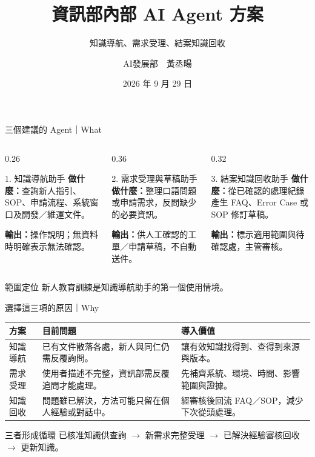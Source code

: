 \documentclass[aspectratio=169,12pt]{beamer}
\title{資訊部內部 AI Agent 方案}
\subtitle{知識導航、需求受理、結案知識回收}
\author{AI發展部　黃丞暘}
\date{2026 年 9 月 29 日}
\begin{document}
\begin{frame}
\titlepage
\end{frame}

\begin{frame}{三個建議的 Agent｜What}
\footnotesize
\begin{columns}[T,onlytextwidth]
\begin{column}{0.26\textwidth}
\begin{block}{1. 知識導航助手}
\textbf{做什麼：}查詢新人指引、SOP、申請流程、系統窗口及開發／維運文件。\par\medskip
\textbf{輸出：}操作說明；無資料時明確表示無法確認。
\end{block}
\end{column}
\begin{column}{0.36\textwidth}
\begin{block}{2. 需求受理與草稿助手}
\textbf{做什麼：}整理口語問題或申請需求，反問缺少的必要資訊。\par\medskip
\textbf{輸出：}供人工確認的工單／申請草稿，不自動送件。
\end{block}
\end{column}
\begin{column}{0.32\textwidth}
\begin{block}{3. 結案知識回收助手}
\textbf{做什麼：}從已確認的處理紀錄產生 FAQ、Error Case 或 SOP 修訂草稿。\par\medskip
\textbf{輸出：}標示適用範圍與待確認處，主管審核。
\end{block}
\end{column}
\end{columns}
\vspace{0.5em}
\begin{alertblock}{範圍定位}
新人教育訓練是知識導航助手的第一個使用情境。
\end{alertblock}
\end{frame}

\begin{frame}{選擇這三項的原因｜Why}
\footnotesize
\begin{tabular}{p{}p{}p{}}
\toprule
\textbf{方案} & \textbf{目前問題} & \textbf{導入價值} \\
\midrule
知識導航 & 已有文件散落各處，新人與同仁仍需反覆詢問。 & 讓有效知識找得到、查得到來源與版本。 \\
\addlinespace[0.7em]
需求受理 & 使用者描述不完整，資訊部需反覆追問才能處理。 & 先補齊系統、環境、時間、影響範圍與證據。 \\
\addlinespace[0.7em]
知識回收 & 問題雖已解決，方法可能只留在個人經驗或對話中。 & 經審核後回流 FAQ／SOP，減少下次從頭處理。 \\
\bottomrule
\end{tabular}
\vspace{0.8em}
\begin{alertblock}{三者形成循環}
已核准知識供查詢 $\rightarrow$ 新需求完整受理 $\rightarrow$ 已解決經驗審核回收 $\rightarrow$ 更新知識。
\end{alertblock}
\end{frame}
\end{document}
